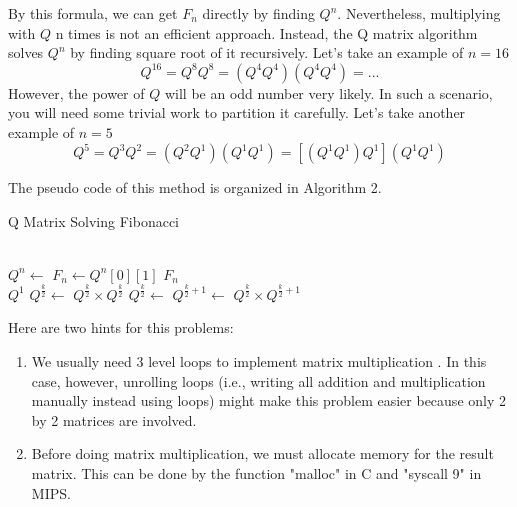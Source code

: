 \documentclass{article}
\begin{document}
By this formula, we can get $F_{n}$ directly by finding $Q^{n}$. Nevertheless, multiplying with $Q$ n times is not an efficient approach.
Instead, the Q matrix algorithm solves $Q^{n}$ by finding square root of it recursively. Let's take an example of $n = 16$
\begin{equation*}
    Q^{16} = Q^{8}Q^{8} = (Q^{4}Q^{4}) (Q^{4}Q^{4}) = ...
\end{equation*}
However, the power of $Q$ will be an odd number very likely. In such a scenario, you will need some trivial work to partition it carefully. Let's take another example of $n = 5$
\begin{equation*}
    Q^{5} = Q^{3}Q^{2} = (Q^{2}Q^{1}) (Q^{1}Q^{1}) = [(Q^{1}Q^{1}) Q^{1}] (Q^{1}Q^{1})
\end{equation*}

The pseudo code of this method is organized in Algorithm 2.

\begin{algorithm}[H]
\caption{Q Matrix Solving Fibonacci}

\begin{algorithmic}
     \\

    \State  $Q^{n} \gets$ 
    \State $F_{n} \gets Q^{n}[0][1]$ 
    \State \Return $F_{n}$\\

        \Return $Q^1$
        \State $Q^{\frac{k}{2}} \gets$ 
        \Return $Q^{\frac{k}{2}} \times Q^{\frac{k}{2}}$
        \State $Q^{\frac{k}{2}} \gets$ 
        \State $Q^{\frac{k}{2}+1} \gets$ 
        \Return $Q^{\frac{k}{2}} \times Q^{\frac{k}{2}+1}$
    \EndIf
        
    \EndFunction


\end{algorithmic}
\end{algorithm}

Here are two hints for this problems:
\begin{enumerate}
    \item We usually need 3 level loops to implement matrix multiplication \cite{matrix}. 
        In this case, however, unrolling loops (i.e., writing all addition and multiplication manually instead using loops) might make this problem easier because only 2 by 2 matrices are involved.
    \item Before doing matrix multiplication, we must allocate memory for the result matrix. 
        This can be done by the function "malloc"\cite{malloc} in C and "syscall 9"\cite{syscall9} in MIPS.
\end{enumerate}
\end{document}
